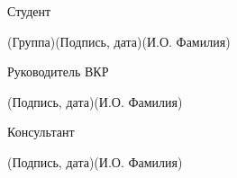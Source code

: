 \documentclass[14pt, russian]{scrartcl}
\begin{document}
\begin{titlepage}
\vspace{\fill}
 

\newlength{\ML}

\noindent Студент \underline{} \hfill \underline{\hspace{4cm}}\quad
\underline{}

\vspace{-2.1ex}
\noindent\hspace{9ex}\scriptsize{(Группа)}\normalsize\hspace{170pt}\hspace{2ex}\scriptsize{(Подпись, дата)}\normalsize\hspace{30pt}\hspace{6ex}\scriptsize{(И.О. Фамилия)}\normalsize

\bigskip

\noindent Руководитель ВКР \hfill \underline{\hspace{4cm}}\quad
\underline{}

\vspace{-2ex}
\noindent\hspace{13.5ex}\normalsize\hspace{170pt}\hspace{2ex}\scriptsize{(Подпись, дата)}\normalsize\hspace{30pt}\hspace{6ex}\scriptsize{(И.О. Фамилия)}\normalsize
\bigskip

\noindent Консультант \hfill \underline{\hspace{4cm}}\quad
\underline{\hspace{4cm}}

\vspace{-2ex}
\noindent\hspace{13.5ex}\normalsize\hspace{170pt}\hspace{2ex}\scriptsize{(Подпись, дата)}\normalsize\hspace{30pt}\hspace{6ex}\scriptsize{(И.О. Фамилия)}\normalsize
\bigskip


\end{titlepage}
\end{document}
